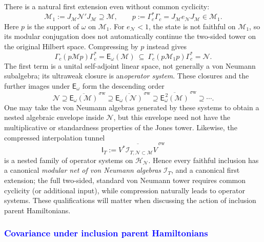 \documentclass[a4paper,11pt]{article}
\theoremstyle{definition}
\newcommand{\mN}{\mathcal{N}}
\newcommand{\mI}{\mathcal{I}}
\newcommand{\mH}{\mathcal{H}}
\newcommand{\mM}{\mathcal{M}}
\newcommand{\NL}[1]{\textcolor{blue}{#1}}
\begin{document}
There is a natural first extension even without common cyclicity:
\begin{equation}
 \mM_1:=J_{\mM}\mN'J_{\mM}\supseteq\mM,\qquad
 p:=\Gamma_c^*\Gamma_c=J_{\mM}e_{\mN}J_{\mM}\in\mM_1.
 \label{eq:interpolation-compressed-extension}
\end{equation}
Here $p$ is the support of $\omega$ on $\mM_1$. For
$e_{\mN}<1$, the state is not faithful on $\mM_1$, so its
modular conjugation does not automatically continue the two-sided
tower on the original Hilbert space. Compressing by $p$ instead gives
\begin{equation}
 \boxed{\quad
 \Gamma_c(p\mM p)\Gamma_c^*=\mathsf E_\omega(\mM)
 \ \subseteq\ 
 \Gamma_c(p\mM_1p)\Gamma_c^*=\mN .\quad}
 \label{eq:interpolation-compressed-system}
\end{equation}
The first term is a unital self-adjoint linear space, not generally a
von Neumann subalgebra; its ultraweak closure is an\emph{operator system}. These closures and the further images
under $\mathsf E_\omega$ form the descending order
\begin{equation}
 \mN\supseteq
 \overline{\mathsf E_\omega(\mM)}^{\,\sigma\mathrm w}
 \supseteq\overline{\mathsf E_\omega(\mN)}^{\,\sigma\mathrm w}
 \supseteq\overline{\mathsf E_\omega^{\,2}(\mM)}^{\,\sigma\mathrm w}
 \supseteq\cdots.
 \label{eq:interpolation-operator-systems}
\end{equation}
One may take the von Neumann algebras generated by these systems to
obtain a nested algebraic envelope inside $\mN$, but this envelope
need not have the multiplicative or standardness properties of the
Jones tower. Likewise, the compressed interpolation tunnel
\begin{equation}
 \mathsf I_T:=\overline{V^*\mI_{T,\mN\subset\mM}V}^{\,\sigma\mathrm w}
 \label{eq:interpolation-compressed-net}
\end{equation}
is a nested family of operator systems on $\mH_{\mN}$.
Hence every faithful inclusion has a canonical \emph{modular net of
von Neumann algebras} $\mI_T$, and a canonical first extension;
the full two-sided, standard von Neumann tower requires common
cyclicity (or additional input), while compression naturally leads
to operator systems. These qualifications will matter when discussing
the action of inclusion parent Hamiltonians.

\subsubsection{\NL{Covariance under inclusion parent Hamiltonians}}
\end{document}

